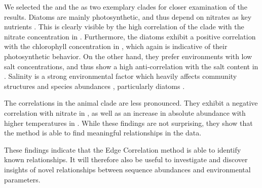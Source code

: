 We selected the  and the  as two exemplary clades for closer examination of the results.
Diatoms are mainly photosynthetic, and thus depend on nitrates as key nutrients \cite{Lozupone2007,Potapova2011}.
This is clearly visible by the high correlation of the clade
with the nitrate concentration in .
Furthermore, the diatoms exhibit a positive correlation
with the chlorophyll concentration in ,
which again is indicative of their photosynthetic behavior.
On the other hand, they prefer environments with low salt concentrations, and thus show a high anti-correlation
with the salt content in .
Salinity is a strong environmental factor which heavily affects community structures
and species abundances \cite{Lozupone2007}, particularly diatoms \cite{Potapova2011}.


The correlations in the animal clade are less pronounced.
They exhibit a negative correlation with nitrate in ,
as well as an increase in absolute abundance with higher temperatures in .
While these findings are not surprising,
they show that the method is able to find meaningful relationships in the data.

These findings indicate that the Edge Correlation method is able to identify known relationships.
It will therefore also be useful to investigate and discover
insights of novel relationships between sequence abundances and environmental parameters.


